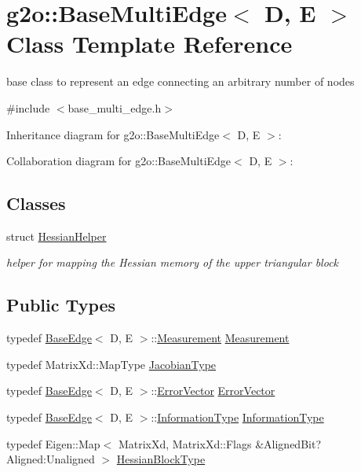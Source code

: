 \hypertarget{classg2o_1_1BaseMultiEdge}{}\section{g2o\+:\+:Base\+Multi\+Edge$<$ D, E $>$ Class Template Reference}
\label{classg2o_1_1BaseMultiEdge}


base class to represent an edge connecting an arbitrary number of nodes  




{\ttfamily \#include $<$base\+\_\+multi\+\_\+edge.\+h$>$}



Inheritance diagram for g2o\+:\+:Base\+Multi\+Edge$<$ D, E $>$\+:


Collaboration diagram for g2o\+:\+:Base\+Multi\+Edge$<$ D, E $>$\+:
\subsection*{Classes}
\begin{DoxyCompactItemize}
\item 
struct \hyperlink{structg2o_1_1BaseMultiEdge_1_1HessianHelper}{Hessian\+Helper}
\begin{DoxyCompactList}\small\item\em helper for mapping the Hessian memory of the upper triangular block \end{DoxyCompactList}\end{DoxyCompactItemize}
\subsection*{Public Types}
\begin{DoxyCompactItemize}
\item 
typedef \hyperlink{classg2o_1_1BaseEdge}{Base\+Edge}$<$ D, E $>$\+::\hyperlink{classg2o_1_1BaseEdge_a2c148abba650a20b8c7eed75d3e2211e}{Measurement} \hyperlink{classg2o_1_1BaseMultiEdge_acbaff4c018fb314db5c7852054ffb89d}{Measurement}
\item 
typedef Matrix\+Xd\+::\+Map\+Type \hyperlink{classg2o_1_1BaseMultiEdge_a43dfdf5b27df296a32ee5a11f0653d55}{Jacobian\+Type}
\item 
typedef \hyperlink{classg2o_1_1BaseEdge}{Base\+Edge}$<$ D, E $>$\+::\hyperlink{classg2o_1_1BaseEdge_af5b558dd24e4be2e437563cae4b3550d}{Error\+Vector} \hyperlink{classg2o_1_1BaseMultiEdge_ae17c6b5747bfed295214942207a6eb74}{Error\+Vector}
\item 
typedef \hyperlink{classg2o_1_1BaseEdge}{Base\+Edge}$<$ D, E $>$\+::\hyperlink{classg2o_1_1BaseEdge_a2e5a33343ac3f189d8a7d5ee4d8b73fc}{Information\+Type} \hyperlink{classg2o_1_1BaseMultiEdge_a368ab136a2cee049549cb479fb4c88fa}{Information\+Type}
\item 
typedef Eigen\+::\+Map$<$ Matrix\+Xd, Matrix\+Xd\+::\+Flags \&Aligned\+Bit?Aligned\+:\+Unaligned $>$ \hyperlink{classg2o_1_1BaseMultiEdge_af299cc8f77d917c1ad4a7d8004aec3a1}{Hessian\+Block\+Type}
\end{DoxyCompactItemize}
